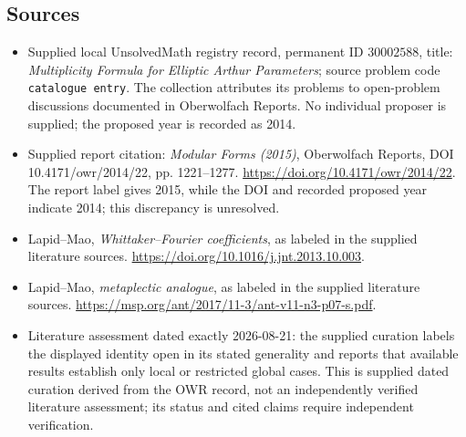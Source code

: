\documentclass[11pt]{article}
\begin{document}
\subsection{Sources}
\begin{itemize}
\item Supplied local UnsolvedMath registry record, permanent ID \(30002588\), title: \emph{Multiplicity Formula for Elliptic Arthur Parameters}; source problem code \texttt{catalogue entry}. The collection attributes its problems to open-problem discussions documented in Oberwolfach Reports. No individual proposer is supplied; the proposed year is recorded as 2014.
\item Supplied report citation: \emph{Modular Forms (2015)}, Oberwolfach Reports, DOI 10.4171/owr/2014/22, pp. 1221--1277. \url{https://doi.org/10.4171/owr/2014/22}. The report label gives 2015, while the DOI and recorded proposed year indicate 2014; this discrepancy is unresolved.
\item Lapid--Mao, \emph{Whittaker--Fourier coefficients}, as labeled in the supplied literature sources. \url{https://doi.org/10.1016/j.jnt.2013.10.003}.
\item Lapid--Mao, \emph{metaplectic analogue}, as labeled in the supplied literature sources. \url{https://msp.org/ant/2017/11-3/ant-v11-n3-p07-s.pdf}.
\item Literature assessment dated exactly 2026-08-21: the supplied curation labels the displayed identity open in its stated generality and reports that available results establish only local or restricted global cases. This is supplied dated curation derived from the OWR record, not an independently verified literature assessment; its status and cited claims require independent verification.
\end{itemize}
\end{document}
